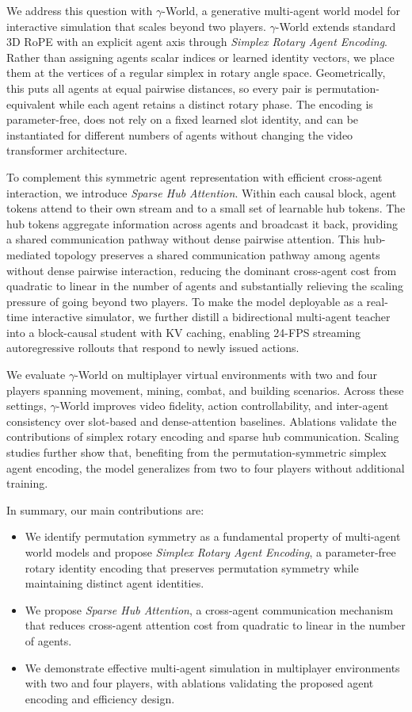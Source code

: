 \documentclass{llmxive}
\providecommand{\ours}{$\gamma$-World\xspace}
\begin{document}
We address this question with \ours, a generative multi-agent world model for interactive simulation that scales beyond two players.
\ours extends standard 3D RoPE with an explicit agent axis through \emph{Simplex Rotary Agent Encoding}.
Rather than assigning agents scalar indices or learned identity vectors, we place them at the vertices of a regular simplex in rotary angle space.
Geometrically, this puts all agents at equal pairwise distances, so every pair is permutation-equivalent while each agent retains a distinct rotary phase.
The encoding is parameter-free, does not rely on a fixed learned slot identity, and can be instantiated for different numbers of agents without changing the video transformer architecture.


To complement this symmetric agent representation with efficient cross-agent interaction, we introduce \emph{Sparse Hub Attention}.
Within each causal block, agent tokens attend to their own stream and to a small set of learnable hub tokens.
The hub tokens aggregate information across agents and broadcast it back, providing a shared communication pathway without dense pairwise attention.
This hub-mediated topology preserves a shared communication pathway among agents without dense pairwise interaction, reducing the dominant cross-agent cost from quadratic to linear in the number of agents and substantially relieving the scaling pressure of going beyond two players.
To make the model deployable as a real-time interactive simulator, we further distill a bidirectional multi-agent teacher into a block-causal student with KV caching, enabling 24-FPS streaming autoregressive rollouts that respond to newly issued actions.

We evaluate \ours on multiplayer virtual environments with two and four players spanning movement, mining, combat, and building scenarios.
Across these settings, \ours improves video fidelity, action controllability, and inter-agent consistency over slot-based and dense-attention baselines. 
Ablations validate the contributions of simplex rotary encoding and sparse hub communication. Scaling studies further show that, benefiting from the permutation-symmetric simplex agent encoding, the model generalizes from two to four players without additional training. 

In summary, our main contributions are:
\begin{itemize}
    \setlength{\itemsep}{0pt}
    \setlength{\parsep}{0pt}
    \setlength{\topsep}{0pt}
    \item We identify permutation symmetry as a fundamental property of multi-agent world models and propose \emph{Simplex Rotary Agent Encoding}, a parameter-free rotary identity encoding that preserves permutation symmetry while maintaining distinct agent identities.
    \item We propose \emph{Sparse Hub Attention}, a cross-agent communication mechanism that reduces cross-agent attention cost from quadratic to linear in the number of agents.
    \item We demonstrate effective multi-agent simulation in multiplayer environments with two and four players, with ablations validating the proposed agent encoding and efficiency design.
\end{itemize}
\end{document}
